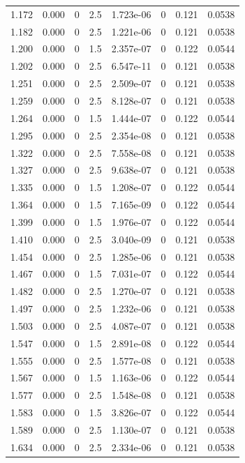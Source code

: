 \documentclass[preview]{standalone}
\begin{document}
{{{\begin{tabular}{L{1.2cm}C{1.2cm} C{0.3cm}C{0.5cm} C{1.4cm}C{1.4cm} C{1.4cm}C{1.4cm}}
  1.172  &  0.000  & 0     & 2.5 &  1.723e-06  & 0  & 0.121 &  0.0538   \\ 
  1.182  &  0.000  & 0     & 2.5 &  1.221e-06  & 0  & 0.121 &  0.0538   \\ 
  1.200  &  0.000  & 0     & 1.5 &  2.357e-07  & 0  & 0.122 &  0.0544   \\ 
  1.202  &  0.000  & 0     & 2.5 &  6.547e-11  & 0  & 0.121 &  0.0538   \\ 
  1.251  &  0.000  & 0     & 2.5 &  2.509e-07  & 0  & 0.121 &  0.0538   \\ 
  1.259  &  0.000  & 0     & 2.5 &  8.128e-07  & 0  & 0.121 &  0.0538   \\ 
  1.264  &  0.000  & 0     & 1.5 &  1.444e-07  & 0  & 0.122 &  0.0544   \\ 
  1.295  &  0.000  & 0     & 2.5 &  2.354e-08  & 0  & 0.121 &  0.0538   \\ 
  1.322  &  0.000  & 0     & 2.5 &  7.558e-08  & 0  & 0.121 &  0.0538   \\ 
  1.327  &  0.000  & 0     & 2.5 &  9.638e-07  & 0  & 0.121 &  0.0538   \\ 
  1.335  &  0.000  & 0     & 1.5 &  1.208e-07  & 0  & 0.122 &  0.0544   \\ 
  1.364  &  0.000  & 0     & 1.5 &  7.165e-09  & 0  & 0.122 &  0.0544   \\ 
  1.399  &  0.000  & 0     & 1.5 &  1.976e-07  & 0  & 0.122 &  0.0544   \\ 
  1.410  &  0.000  & 0     & 2.5 &  3.040e-09  & 0  & 0.121 &  0.0538   \\ 
  1.454  &  0.000  & 0     & 2.5 &  1.285e-06  & 0  & 0.121 &  0.0538   \\ 
  1.467  &  0.000  & 0     & 1.5 &  7.031e-07  & 0  & 0.122 &  0.0544   \\ 
  1.482  &  0.000  & 0     & 2.5 &  1.270e-07  & 0  & 0.121 &  0.0538   \\ 
  1.497  &  0.000  & 0     & 2.5 &  1.232e-06  & 0  & 0.121 &  0.0538   \\ 
  1.503  &  0.000  & 0     & 2.5 &  4.087e-07  & 0  & 0.121 &  0.0538   \\ 
  1.547  &  0.000  & 0     & 1.5 &  2.891e-08  & 0  & 0.122 &  0.0544   \\ 
  1.555  &  0.000  & 0     & 2.5 &  1.577e-08  & 0  & 0.121 &  0.0538   \\ 
  1.567  &  0.000  & 0     & 1.5 &  1.163e-06  & 0  & 0.122 &  0.0544   \\ 
  1.577  &  0.000  & 0     & 2.5 &  1.548e-08  & 0  & 0.121 &  0.0538   \\ 
  1.583  &  0.000  & 0     & 1.5 &  3.826e-07  & 0  & 0.122 &  0.0544   \\ 
  1.589  &  0.000  & 0     & 2.5 &  1.130e-07  & 0  & 0.121 &  0.0538   \\ 
  1.634  &  0.000  & 0     & 2.5 &  2.334e-06  & 0  & 0.121 &  0.0538   \\ 
\hline 
\end{tabular} 

}}}
\end{document}

